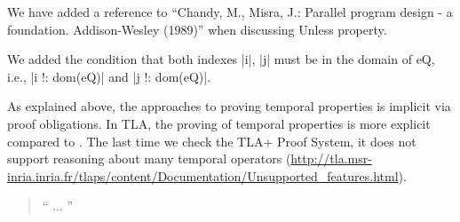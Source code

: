 \documentclass{response}
\begin{document}
\begin{comment}{Reviewer \#1}
• p.25 A reference to the seminal Unless of Unity could be in order.
\end{comment}

\begin{response}
  We have added a reference to ``Chandy, M., Misra, J.: Parallel
  program design - a foundation. Addison-Wesley (1989)'' when
  discussing Unless property.
\end{response}


\begin{comment}{Reviewer \#1}
• p. 26 (Theorem 5) I think that the indexes in eQ should be first stated
as legal in both quantifications.
\end{comment}

\begin{response}
  We added the condition that both indexes |i|, |j| must be in the
  domain of eQ, i.e., |i !: dom(eQ)| and |j !: dom(eQ)|.
\end{response}


\begin{comment}{Reviewer \#1}
• p. 27 All the temporal proofs have been done in an adhoc way without
any tool support. It would be interesting to have a feedback about
this? To be provocative, if you are interested in temporal proofs why
did you choose this tool? Have you considered TLA which does support
temporal proofs (as well as refinements in a certain way)?
\end{comment}

\begin{response}
As explained above, the \EventB approaches to proving temporal properties is
implicit via proof obligations. In TLA, the proving of temporal
properties is more explicit compared to \EventB. The last time we check the TLA+ Proof
System, it does not support reasoning about many temporal operators (\url{http://tla.msr-inria.inria.fr/tlaps/content/Documentation/Unsupported_features.html}).
\begin{quote}
    `` ...
   ''
  \end{quote}
\end{response}


\begin{comment}{Reviewer \#1}
• It would be interesting to analyze if the proofs are specific to the ex-
ample or to the underlying semantics?
PS Could you put another zip version on the repository: I have had some
strange problems (missing characters) with some machine files? For such
files, I was not able to play again the proofs.
\end{comment}
\end{document}

